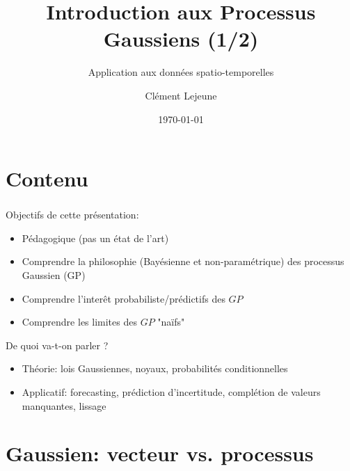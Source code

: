 \documentclass[xcolor=svgnames, t]{beamer}
\title[Introduction aux Processus Gaussiens]{Introduction aux Processus Gaussiens (1/2)}
\subtitle{Application aux données spatio-temporelles}
\institute[]{}
\author[Cl\'ement Lejeune]{Cl\'ement Lejeune}
\institute[TSN/AD/AD3/IA]{
Thales Services Numériques,
\\ AD/AD3/IA
}
\date{\today}
\begin{document}
\frame{\titlepage}

\section{Contenu}
\begin{frame}\frametitle{\secname}
  Objectifs de cette présentation:
  \begin{itemize}
    \item Pédagogique (pas un état de l'art)
    \pause
    \item Comprendre la philosophie (Bayésienne et non-paramétrique) des processus Gaussien (GP)
    \pause
    \item Comprendre l'interêt probabiliste/prédictifs des $GP$
    \pause
    \item Comprendre les limites des $GP$ "naïfs"
  \end{itemize}
  De quoi va-t-on parler ?
  \begin{itemize}
    \item Théorie: lois Gaussiennes, noyaux, probabilités conditionnelles
    \pause
    \item Applicatif: forecasting, prédiction d'incertitude, complétion de valeurs manquantes, lissage
  \end{itemize}
\end{frame}

\AtBeginSubsection[]
{
  \begin{frame}\frametitle{\secname}
    \tableofcontents[currentsubsection]
  \end{frame}
}

\section{Gaussien: vecteur vs. processus}
\end{document}
